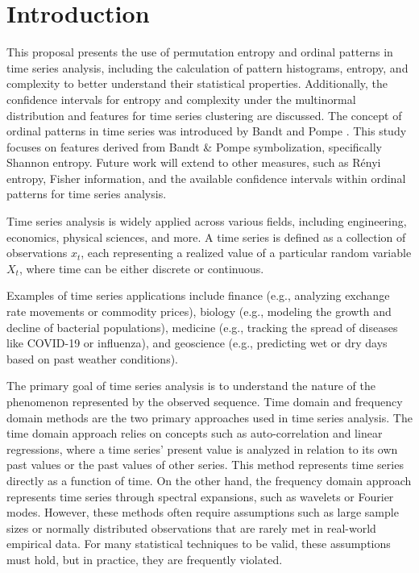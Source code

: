 \chapter{Introduction}\label{C:intro}

This proposal presents the use of permutation entropy and ordinal patterns in time series analysis, including the calculation of pattern histograms, entropy, and complexity to better understand their statistical properties. Additionally, the confidence intervals for entropy and complexity under the multinormal distribution and features for time series clustering are discussed. The concept of ordinal patterns in time series was introduced by Bandt and Pompe \cite{PhysRevLett.88.174102}. This study focuses on features derived from Bandt \& Pompe symbolization, specifically Shannon entropy. Future work will extend to other measures, such as Rényi entropy, Fisher information, and the available confidence intervals within ordinal patterns for time series analysis.

Time series analysis is widely applied across various fields, including engineering, economics, physical sciences, and more. A time series is defined as a collection of observations ${x_t}$, each representing a realized value of a particular random variable $X_t$, where time can be either discrete or continuous.

Examples of time series applications include finance (e.g., analyzing exchange rate movements or commodity prices), biology (e.g., modeling the growth and decline of bacterial populations), medicine (e.g., tracking the spread of diseases like COVID-19 or influenza), and geoscience (e.g., predicting wet or dry days based on past weather conditions).

The primary goal of time series analysis is to understand the nature of the phenomenon represented by the observed sequence. Time domain and frequency domain methods are the two primary approaches used in time series analysis. The time domain approach relies on concepts such as auto-correlation and linear regressions, where a time series' present value is analyzed in relation to its own past values or the past values of other series. This method represents time series directly as a function of time. On the other hand, the frequency domain approach represents time series through spectral expansions, such as wavelets or Fourier modes. However, these methods often require assumptions such as large sample sizes or normally distributed observations that are rarely met in real-world empirical data. For many statistical techniques to be valid, these assumptions must hold, but in practice, they are frequently violated.

